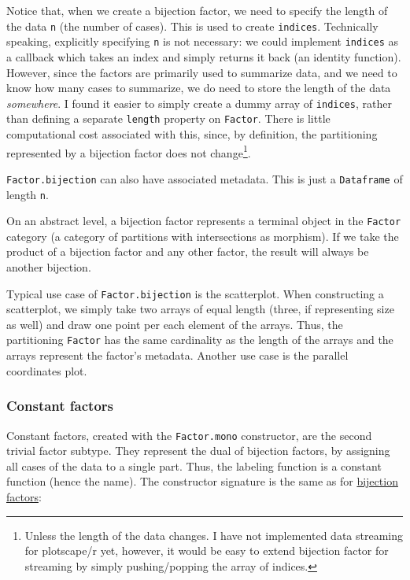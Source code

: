 \documentclass[
]{book}
\theoremstyle{definition}
\theoremstyle{definition}
\theoremstyle{definition}
\theoremstyle{definition}
\theoremstyle{remark}
\begin{document}
Notice that, when we create a bijection factor, we need to specify the length of the data \texttt{n} (the number of cases). This is used to create \texttt{indices}. Technically speaking, explicitly specifying \texttt{n} is not necessary: we could implement \texttt{indices} as a callback which takes an index and simply returns it back (an identity function). However, since the factors are primarily used to summarize data, and we need to know how many cases to summarize, we do need to store the length of the data \emph{somewhere}. I found it easier to simply create a dummy array of \texttt{indices}, rather than defining a separate \texttt{length} property on \texttt{Factor}. There is little computational cost associated with this, since, by definition, the partitioning represented by a bijection factor does not change\footnote{Unless the length of the data changes. I have not implemented data streaming for plotscape/r yet, however, it would be easy to extend bijection factor for streaming by simply pushing/popping the array of indices.}.

\texttt{Factor.bijection} can also have associated metadata. This is just a \texttt{Dataframe} of length \texttt{n}.

On an abstract level, a bijection factor represents a terminal object in the \texttt{Factor} category (a category of partitions with intersections as morphism). If we take the product of a bijection factor and any other factor, the result will always be another bijection.

Typical use case of \texttt{Factor.bijection} is the scatterplot. When constructing a scatterplot, we simply take two arrays of equal length (three, if representing size as well) and draw one point per each element of the arrays. Thus, the partitioning \texttt{Factor} has the same cardinality as the length of the arrays and the arrays represent the factor's metadata. Another use case is the parallel coordinates plot.

\subsubsection{Constant factors}\label{constant-factors}

Constant factors, created with the \texttt{Factor.mono} constructor, are the second trivial factor subtype. They represent the dual of bijection factors, by assigning all cases of the data to a single part. Thus, the labeling function is a constant function (hence the name). The constructor signature is the same as for \hyperref[Bijectionux5cux2520factors]{bijection factors}:
\end{document}
